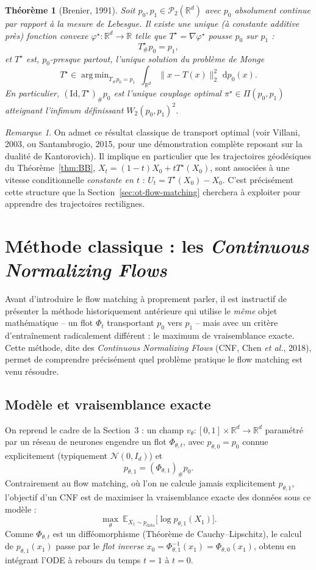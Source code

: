 \documentclass[11pt,a4paper]{article}
\theoremstyle{definition}
\theoremstyle{plain}
\newtheorem{theoreme}{Théorème}[section]
\theoremstyle{remark}
\newtheorem{remark}{Remarque}[section]
\newcommand{\R}{\mathbb{R}}
\newcommand{\E}{\mathbb{E}}
\newcommand{\Id}{\mathrm{Id}}
\newcommand{\dd}{\,\mathrm{d}}
\DeclareMathOperator*{\argmin}{arg\,min}
\begin{document}
\begin{theoreme}[Brenier, 1991]\label{thm:brenier}
Soit $p_0,p_1\in\mathcal{P}_2(\R^d)$ avec $p_0$ absolument continue par rapport
à la mesure de Lebesgue. Il existe une unique (à constante additive près)
fonction convexe $\varphi^\star:\R^d\to\R$ telle que $T^\star=\nabla\varphi^\star$
pousse $p_0$ sur $p_1$ :
\[
  T^\star_\#p_0 = p_1,
\]
et $T^\star$ est, $p_0$-presque partout, l'unique solution du problème de Monge
\[
  T^\star \in \argmin_{T_\#p_0=p_1}\ \int_{\R^d}\|x-T(x)\|_2^2\,\dd p_0(x).
\]
En particulier, $(\Id,T^\star)_\#p_0$ est l'unique couplage optimal
$\pi^\star\in\Pi(p_0,p_1)$ atteignant l'infimum définissant $W_2(p_0,p_1)^2$.
\end{theoreme}

\begin{remark}
On admet ce résultat classique de transport optimal (voir Villani, 2003, ou
Santambrogio, 2015, pour une démonstration complète reposant sur la dualité de
Kantorovich). Il implique en particulier que les trajectoires géodésiques du
Théorème~\ref{thm:BB}, $X_t=(1-t)X_0+tT^\star(X_0)$, sont associées à une
vitesse conditionnelle \emph{constante en $t$} : $U_t=T^\star(X_0)-X_0$. C'est
précisément cette structure que la Section~\ref{sec:ot-flow-matching}
cherchera à exploiter pour apprendre des trajectoires rectilignes.
\end{remark}

\section{Méthode classique : les \emph{Continuous Normalizing Flows}}\label{sec:cnf}

Avant d'introduire le flow matching à proprement parler, il est instructif de
présenter la méthode historiquement antérieure qui utilise le \emph{même} objet
mathématique -- un flot $\Phi_t$ transportant $p_0$ vers $p_1$ -- mais avec un
critère d'entraînement radicalement différent : le maximum de vraisemblance
exacte. Cette méthode, dite des \emph{Continuous Normalizing Flows} (CNF, Chen
\emph{et al.}, 2018), permet de comprendre précisément quel problème pratique le
flow matching est venu résoudre.

\subsection{Modèle et vraisemblance exacte}

On reprend le cadre de la Section~3 : un champ $v_{\theta}:[0,1]\times\R^d\to\R^d$
paramétré par un réseau de neurones engendre un flot $\Phi_{\theta,t}$, avec
$p_{\theta,0}=p_0$ connue explicitement (typiquement $\mathcal{N}(0,I_d)$) et
\[
  p_{\theta,1} = (\Phi_{\theta,1})_\#p_0.
\]
Contrairement au flow matching, où l'on ne calcule jamais explicitement
$p_{\theta,1}$, l'objectif d'un CNF est de maximiser la vraisemblance exacte des
données sous ce modèle :
\[
  \max_\theta\ \E_{X_1\sim p_{\mathrm{data}}}\bigl[\log p_{\theta,1}(X_1)\bigr].
\]
Comme $\Phi_{\theta,t}$ est un difféomorphisme (Théorème de Cauchy--Lipschitz),
le calcul de $p_{\theta,1}(x_1)$ passe par le \emph{flot inverse}
$x_0=\Phi_{\theta,1}^{-1}(x_1)=\Phi_{\theta,0}(x_1)$, obtenu en intégrant l'ODE
à rebours du temps $t=1$ à $t=0$.
\end{document}
